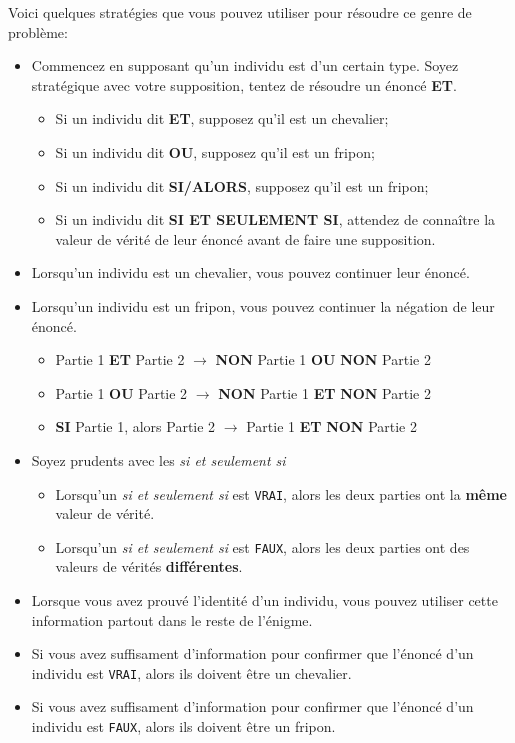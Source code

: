 \documentclass[
  letterpaper,
]{scrbook}
\providecommand{\tightlist}{%
  \setlength{\itemsep}{0pt}\setlength{\parskip}{0pt}}\usepackage{longtable,booktabs,array}
\theoremstyle{plain}
\theoremstyle{definition}
\theoremstyle{definition}
\theoremstyle{remark}
\begin{document}
Voici quelques stratégies que vous pouvez utiliser pour résoudre ce
genre de problème:

\begin{itemize}
\tightlist
\item
  Commencez en supposant qu'un individu est d'un certain type. Soyez
  stratégique avec votre supposition, tentez de résoudre un énoncé
  \textbf{ET}.

  \begin{itemize}
  \tightlist
  \item
    Si un individu dit \textbf{ET}, supposez qu'il est un chevalier;
  \item
    Si un individu dit \textbf{OU}, supposez qu'il est un fripon;
  \item
    Si un individu dit \textbf{SI/ALORS}, supposez qu'il est un fripon;
  \item
    Si un individu dit \textbf{SI ET SEULEMENT SI}, attendez de
    connaître la valeur de vérité de leur énoncé avant de faire une
    supposition.
  \end{itemize}
\item
  Lorsqu'un individu est un chevalier, vous pouvez continuer leur
  énoncé.
\item
  Lorsqu'un individu est un fripon, vous pouvez continuer la négation de
  leur énoncé.

  \begin{itemize}
  \tightlist
  \item
    Partie 1 \textbf{ET} Partie 2 \(\rightarrow\) \textbf{NON} Partie 1
    \textbf{OU} \textbf{NON} Partie 2
  \item
    Partie 1 \textbf{OU} Partie 2 \(\rightarrow\) \textbf{NON} Partie 1
    \textbf{ET} \textbf{NON} Partie 2
  \item
    \textbf{SI} Partie 1, alors Partie 2 \(\rightarrow\) Partie 1
    \textbf{ET} \textbf{NON} Partie 2
  \end{itemize}
\item
  Soyez prudents avec les \emph{si et seulement si}

  \begin{itemize}
  \tightlist
  \item
    Lorsqu'un \emph{si et seulement si} est \texttt{VRAI}, alors les
    deux parties ont la \textbf{même} valeur de vérité.
  \item
    Lorsqu'un \emph{si et seulement si} est \texttt{FAUX}, alors les
    deux parties ont des valeurs de vérités \textbf{différentes}.
  \end{itemize}
\item
  Lorsque vous avez prouvé l'identité d'un individu, vous pouvez
  utiliser cette information partout dans le reste de l'énigme.
\item
  Si vous avez suffisament d'information pour confirmer que l'énoncé
  d'un individu est \texttt{VRAI}, alors ils doivent être un chevalier.
\item
  Si vous avez suffisament d'information pour confirmer que l'énoncé
  d'un individu est \texttt{FAUX}, alors ils doivent être un fripon.
\end{itemize}
\end{document}
